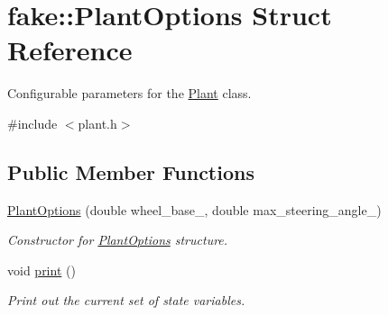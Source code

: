 \hypertarget{structfake_1_1_plant_options}{}\section{fake\+:\+:Plant\+Options Struct Reference}
\label{structfake_1_1_plant_options}


Configurable parameters for the \hyperlink{classfake_1_1_plant}{Plant} class.  




{\ttfamily \#include $<$plant.\+h$>$}

\subsection*{Public Member Functions}
\begin{DoxyCompactItemize}
\item 
\hyperlink{structfake_1_1_plant_options_ad3757f5f0e5624335772a3d4c42ab91c}{Plant\+Options} (double wheel\+\_\+base\+\_\+, double max\+\_\+steering\+\_\+angle\+\_\+)
\begin{DoxyCompactList}\small\item\em Constructor for \hyperlink{structfake_1_1_plant_options}{Plant\+Options} structure. \end{DoxyCompactList}\item 
\mbox{\label{structfake_1_1_plant_options_a0326322942b8dd32a65a898a2403a1fe}} 
void \hyperlink{structfake_1_1_plant_options_a0326322942b8dd32a65a898a2403a1fe}{print} ()
\begin{DoxyCompactList}\small\item\em Print out the current set of state variables. \end{DoxyCompactList}\end{DoxyCompactItemize}
